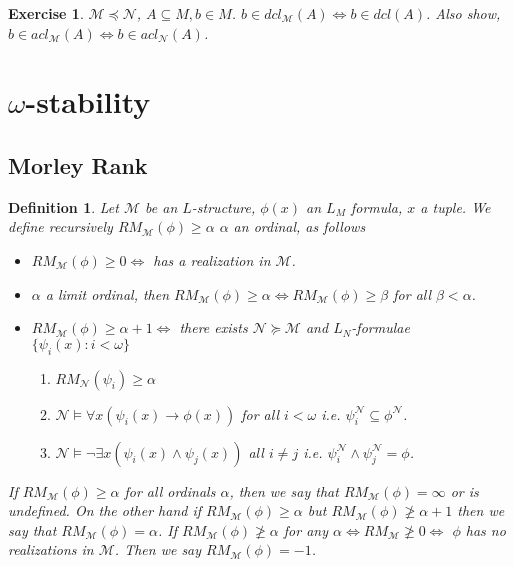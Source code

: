 \documentclass[letterpaper, 12pt]{article}
\newcommand{\cM}{\mathcal{M}}
\newcommand{\cN}{\mathcal{N}}
\theoremstyle{stdthm}
\theoremstyle{stddef}
\newtheorem{defn}[thm]{Definition}
\theoremstyle{stdnonum}
\theoremstyle{stdqands}
\theoremstyle{stdbold}
\newtheorem{exercise}{Exercise}
\begin{document}
\begin{exercise}
$\cM \preceq \cN$, $A \subseteq M, b \in M$. $b \in dcl_\cM(A) \Leftrightarrow b \in dcl(A)$. Also show, $b \in acl_\cM(A) \Leftrightarrow b \in acl_\cN(A)$. 
\end{exercise}

\newpage

\section{$\omega$-stability}

\subsection{Morley Rank}

\begin{defn}
Let $\cM$ be an $L$-structure, $\phi(x)$ an $L_M$ formula, $x$ a tuple. We define recursively $RM_\cM (\phi) \geq \alpha$  $\alpha$ an ordinal, as follows
\begin{itemize}
\item $RM_\cM(\phi) \geq 0 \Leftrightarrow$ has a realization in $\cM$. 
\item $\alpha$ a limit ordinal, then $RM_\cM(\phi) \geq \alpha \Leftrightarrow RM_\cM(\phi) \geq \beta$ for all $\beta < \alpha$. 
\item $RM_\cM(\phi) \geq \alpha + 1 \iff $ there exists $\cN \succeq \cM$ and $L_N$-formulae $\{\psi_i(x): i<\omega\}$ 
\begin{enumerate}
\item $RM_\cN(\psi_i) \geq \alpha$
\item $\cN \models \forall x(\psi_i(x) \to \phi(x))$ for all $i < \omega$ i.e. $\psi_i^\cN \subseteq \phi^\cN$. 
\item $\cN \models \neg \exists x(\psi_i(x) \wedge \psi_j(x))$ all $i\neq j$ i.e. $\psi_i^\cN \wedge \psi_j^\cN = \phi$. 
\end{enumerate}
\end{itemize}
If $RM_\cM(\phi) \geq \alpha$ for all ordinals $\alpha$, then we say that $RM_\cM(\phi) = \infty$ or is undefined. On the other hand if $RM_\cM(\phi) \geq \alpha$ but $ RM_\cM(\phi)\ngeq \alpha + 1$ then we say that $RM_\cM(\phi) = \alpha$. If $RM_\cM(\phi) \ngeq \alpha$ for any $\alpha \iff RM_\cM \ngeq 0 \iff$ $\phi$ has no realizations in $\cM$. Then we say $RM_\cM(\phi) = -1$. 

\end{defn}
\end{document}
